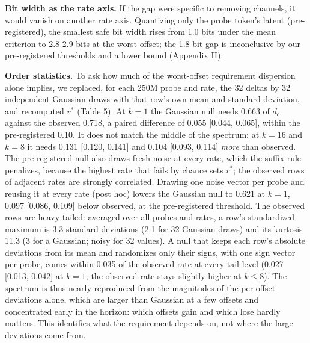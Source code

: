 \documentclass[11pt]{article}
\begin{document}
\textbf{Bit width as the rate axis.} If the gap were specific to removing channels, it would vanish on another rate axis. Quantizing only the probe token's latent (pre-registered), the smallest safe bit width rises from 1.0 bits under the mean criterion to 2.8-2.9 bits at the worst offset; the 1.8-bit gap is inconclusive by our pre-registered thresholds and a lower bound (Appendix H).

\textbf{Order statistics.} To ask how much of the worst-offset requirement dispersion alone implies, we replaced, for each 250M probe and rate, the 32 deltas by 32 independent Gaussian draws with that row's own mean and standard deviation, and recomputed $r^*$ (Table 5). At $k=1$ the Gaussian null needs 0.663 of $d_c$ against the observed 0.718, a paired difference of 0.055 [0.044, 0.065], within the pre-registered 0.10. It does not match the middle of the spectrum: at $k=16$ and $k=8$ it needs 0.131 [0.120, 0.141] and 0.104 [0.093, 0.114] \textit{more} than observed. The pre-registered null also draws fresh noise at every rate, which the suffix rule penalizes, because the highest rate that fails by chance sets $r^*$; the observed rows of adjacent rates are strongly correlated. Drawing one noise vector per probe and reusing it at every rate (post hoc) lowers the Gaussian null to 0.621 at $k=1$, 0.097 [0.086, 0.109] below observed, at the pre-registered threshold. The observed rows are heavy-tailed: averaged over all probes and rates, a row's standardized maximum is 3.3 standard deviations (2.1 for 32 Gaussian draws) and its kurtosis 11.3 (3 for a Gaussian; noisy for 32 values). A null that keeps each row's absolute deviations from its mean and randomizes only their signs, with one sign vector per probe, comes within 0.035 of the observed rate at every tail level (0.027 [0.013, 0.042] at $k=1$; the observed rate stays slightly higher at $k\le8$). The spectrum is thus nearly reproduced from the magnitudes of the per-offset deviations alone, which are larger than Gaussian at a few offsets and concentrated early in the horizon: which offsets gain and which lose hardly matters. This identifies what the requirement depends on, not where the large deviations come from.
\end{document}
